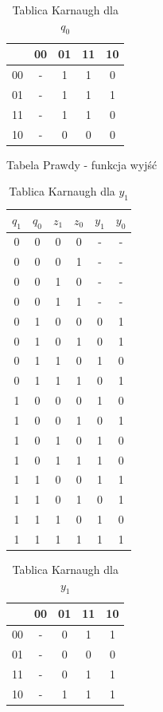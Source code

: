 \documentclass[12pt,a4paper]{article}
\begin{document}
\begin{table}[H]
\begin{minipage}{.5\textwidth}
				\caption{Tablica Karnaugh dla $q_0$}
				\vspace{0.2cm}
				\centering
				\begin{tabular}{c|c|c|c|c}
					\backslashbox{$z_1z_0$}{$q_1q_0$}&00&01&11&10\\\hline
					00	&	-	&	1	&	1	&	0	\\\hline
					01	&	-	&	1	&	1	&	1	\\\hline
					11	&	-	&	1	&	1	&	0	\\\hline
					10	&	-	&	0	&	0	&	0	
				\end{tabular}
			\end{minipage}
			\end{table}
		
			\begin{table}[H]
			\begin{minipage}{.5\textwidth}
				\caption{Tabela Prawdy - funkcja wyjść}
				\vspace{0.2cm}
				\centering
				\begin{tabular}{cccc|cc}
					\(q_1\)&\(q_0\)&\(z_1\)&\(z_0\)&\(y_1\)&\(y_0\)\\\hline
					0	&	0	&	0	&	0	&	-	&	-	\\
					0	&	0	&	0	&	1	&	-	&	-	\\
					0	&	0	&	1	&	0	&	-	&	-	\\
					0	&	0	&	1	&	1	&	-	&	-	\\\hline
					0	&	1	&	0	&	0	&	0	&	1	\\
					0	&	1	&	0	&	1	&	0	&	1	\\
					0	&	1	&	1	&	0	&	1	&	0	\\
					0	&	1	&	1	&	1	&	0	&	1	\\\hline
					1	&	0	&	0	&	0	&	1	&	0	\\
					1	&	0	&	0	&	1	&	0	&	1	\\
					1	&	0	&	1	&	0	&	1	&	0	\\
					1	&	0	&	1	&	1	&	1	&	0	\\\hline
					1	&	1	&	0	&	0	&	1	&	1	\\
					1	&	1	&	0	&	1	&	0	&	1	\\
					1	&	1	&	1	&	0	&	1	&	0	\\
					1	&	1	&	1	&	1	&	1	&	1	\\
				\end{tabular}
			\end{minipage}%
			\begin{minipage}{.5\textwidth}
				\caption{Tablica Karnaugh dla $y_1$}
				\vspace{0.2cm}
				\centering
				\begin{tabular}{c|c|c|c|c}
					\backslashbox{$z_1z_0$}{$q_1q_0$}&00&01&11&10\\\hline
					00	&	-	&	0	&	1	&	1	\\\hline
					01	&	-	&	0	&	0	&	0	\\\hline
					11	&	-	&	0	&	1	&	1	\\\hline
					10	&	-	&	1	&	1	&	1	
				\end{tabular}
				\vspace{1cm}
				

\end{minipage}
\end{table}
\end{document}
